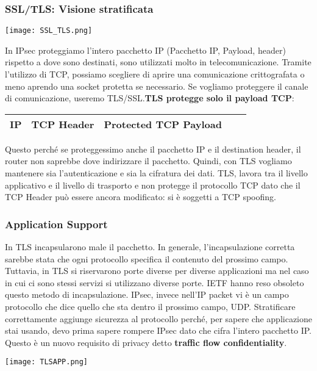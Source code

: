 \documentclass{article}
\theoremstyle{remark}
\begin{document}
\subsubsection{SSL/TLS: Visione stratificata}
\begin{center}
	\texttt{[image: SSL\_TLS.png]}
\end{center}
In IPsec proteggiamo l'intero pacchetto IP (Pacchetto IP, Payload, header) rispetto a dove sono destinati, sono utilizzati molto in telecomunicazione. \newline
Tramite l'utilizzo di TCP, possiamo scegliere di aprire una comunicazione crittografata o meno aprendo una socket protetta se necessario. Se vogliamo proteggere il canale di comunicazione, useremo TLS/SSL.\textbf{TLS protegge solo il payload TCP}:
\begin{center}
	\begin{tabular}{ |c|c|c|c|c| }
		\hline
		IP & TCP Header & \textbf{Protected TCP Payload} \\
		\hline
	\end{tabular}
\end{center}
Questo perché se proteggessimo anche il pacchetto IP e il destination header, il router non saprebbe dove indirizzare il pacchetto. Quindi, con TLS vogliamo mantenere sia l'autenticazione e sia la cifratura dei dati.\newline
TLS, lavora tra il livello applicativo e il livello di trasporto e non protegge il protocollo TCP dato che il TCP Header può essere ancora modificato: si è soggetti a TCP spoofing.
\subsubsection{Application Support}
In TLS incapsularono male il pacchetto. In generale, l'incapsulazione corretta sarebbe stata che ogni protocollo specifica il contenuto del prossimo campo. Tuttavia, in TLS si riservarono porte diverse per diverse applicazioni ma nel caso in cui ci sono stessi servizi si utilizzano diverse porte. IETF hanno reso obsoleto questo metodo di incapsulazione.
IPsec, invece nell'IP packet vi è un campo protocollo che dice quello che sta dentro il prossimo campo, UDP.\newline
Stratificare correttamente aggiunge sicurezza al protocollo perché, per sapere che applicazione stai usando, devo prima sapere rompere IPsec dato che cifra l'intero pacchetto IP. Questo è un nuovo requisito di privacy detto \textbf{traffic flow confidentiality}.
\begin{center}
	\texttt{[image: TLSAPP.png]}
\end{center}
\end{document}

